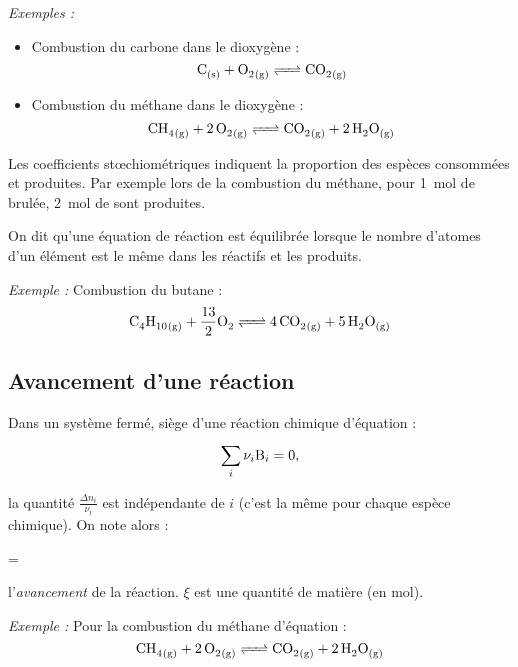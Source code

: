 \documentclass[MPSI]{cours}
\begin{document}
\textit{Exemples : } 
\begin{itemize}
  \item Combustion du carbone dans le dioxygène :
  \begin{equation*}
    \ce{C_{(s)} + O2_{(g)} <=> CO2_{(g)}}
  \end{equation*}

  \item Combustion du méthane dans le dioxygène :
  \begin{equation*}
    \ce{CH4_{(g)} + 2O2_{(g)} <=> CO2_{(g)} + 2H2O_{(g)}}
  \end{equation*}
\end{itemize}

Les coefficients st\oe{}chiométriques indiquent la proportion des espèces consommées et produites. Par exemple lors de la combustion du méthane, pour \SI{1}{mol} de  brulée, \SI{2}{mol} de  sont produites.

On dit qu'une équation de réaction est équilibrée lorsque le nombre d'atomes d'un élément est le même dans les réactifs et les produits.

\textit{Exemple : } Combustion du butane :
\begin{equation*}
  \ce{C4H10_{(g)} + \frac{13}{2}O2 <=> 4CO2_{(g)} + 5H2O_{(g)}}
\end{equation*}

\subsection{Avancement d'une réaction}%
\label{sub:avancement_d_une_réaction}

Dans un système fermé, siège d'une réaction chimique d'équation :
\begin{equation*}
  \sum^{}_{i} \nu_i \ce{B}_i = 0 ,
\end{equation*}

la quantité $\frac{\Delta n_i}{\nu_i}$ est indépendante de $i$ (c'est la même pour chaque espèce chimique). On note alors :
\begin{eqencadre}
  \xi = 
\end{eqencadre}
l'\emph{avancement} de la réaction. $\xi$ est une quantité de matière (en mol). 

\textit{Exemple : } Pour la combustion du méthane d'équation :
\begin{equation*}
    \ce{CH4_{(g)} + 2O2_{(g)} <=> CO2_{(g)} + 2H2O_{(g)}}
\end{equation*}
\end{document}
